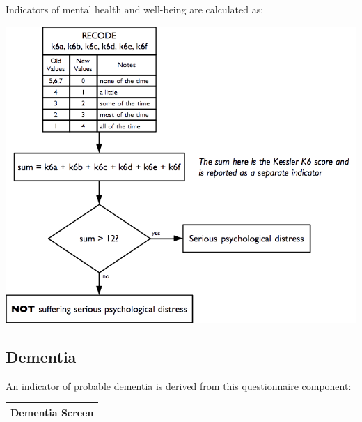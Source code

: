 \documentclass[12pt,a4paper]{book}
\theoremstyle{definition}
\theoremstyle{definition}
\theoremstyle{definition}
\theoremstyle{remark}
\begin{document}
\newpage

Indicators of mental health and well-being are calculated as:

\begin{center}\includegraphics{figures/indicators19} \end{center}

\newpage

\hypertarget{dementia}{%
\subsection{Dementia}\label{dementia}}

An indicator of probable dementia is derived from this questionnaire
component:

\begin{longtable}[]{@{}c@{}}
\toprule
\begin{minipage}[t]{0.97\columnwidth}\centering
\textbf{Dementia Screen}\strut
\end{minipage}\tabularnewline
\bottomrule
\end{longtable}
\end{document}
